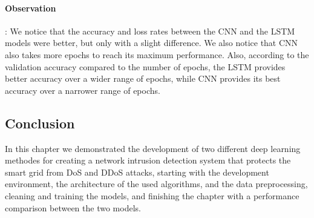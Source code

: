 \paragraph{Observation}: We notice that the accuracy and loss rates between the CNN and the LSTM models were better, but only with a slight difference. We also notice that CNN also takes more epochs to reach its maximum performance. Also,  according to the validation accuracy compared to the number of epochs, the LSTM provides better accuracy over a wider range of epochs, while CNN provides its best accuracy over a narrower range of epochs.

		







\subsection{Conclusion}
In this chapter we demonstrated the development of two different deep learning methodes for creating a network intrusion detection system that protects the smart grid from DoS and DDoS attacks, starting with the development environment, the architecture of the used algorithms, and the data preprocessing, cleaning and training the models, and finishing the chapter with a performance comparison between the two models.





\newpage












